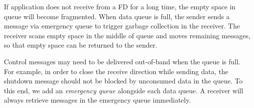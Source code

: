 If application does not receive from a FD for a long time, the empty space in queue will become fragmented.
When data queue is full, the sender sends a message via emergency queue to trigger garbage collection in the receiver.
The receiver scans empty space in the middle of queue and moves remaining messages, so that empty space can be returned to the sender.

Control messages may need to be delivered out-of-band when the queue is full. For example, in order to close the receive direction while sending data, the shutdown message should not be blocked by unconsumed data in the queue. To this end, we add an \textit{emergency queue} alongside each data queue.
A receiver will always retrieve messages in the emergency queue immediately.
\fi

